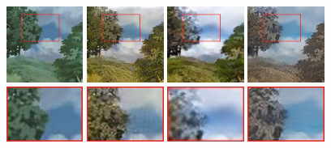 \documentclass[runningheads]{llncs}
\begin{document}
\begin{figure}[!htb]
\centering     %
\subfigure
{\includegraphics[width=25mm]{zooming_picture/in_x.jpg}}
\subfigure
{\includegraphics[width=25mm]{zooming_picture/our_x.jpg}}
\subfigure
{\includegraphics[width=25mm]{zooming_picture/unit_nx.jpg}}
\subfigure
{\includegraphics[width=25mm]{zooming_picture/sgan_x.jpg}}
\subfigure
{\includegraphics[width=25mm]{zooming_picture/in_y.jpg}}
\subfigure
{\includegraphics[width=25mm]{zooming_picture/our_y.jpg}}
\subfigure
{\includegraphics[width=25mm]{zooming_picture/unit_ny.jpg}}
\subfigure
{\includegraphics[width=25mm]{zooming_picture/sgan_y.jpg}}

\end{figure}
\end{document}
